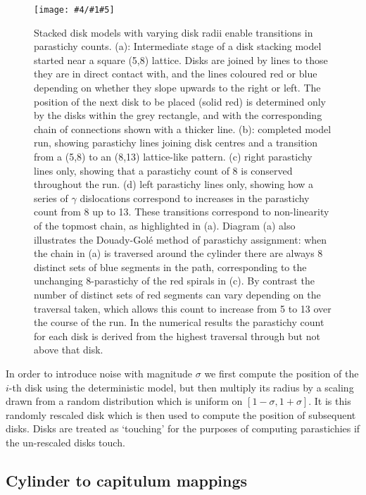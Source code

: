 \documentclass[a4paper,10pt]{amsart}
\newlength{\jfigwidth}
\newcommand{\pdffig}[3]{\jdofig{#1}{#2}{#3}{Figures}{.pdf}}
\newcommand{\jdofig}[5]{
	\begin{figure}\centering\texttt{[image: \#4/\#1\#5]} \caption{#2}\label{fig:#1}\end{figure}
}
\begin{document}
%
\pdffig{scpDeterministicTransition}{
	Stacked disk models with varying disk radii enable transitions in parastichy counts. (a): Intermediate stage of a disk stacking model started near a square  (5,8) lattice. Disks are joined by lines to those they are in direct contact with, and the lines coloured red or blue depending on whether they slope upwards to the right or left. The position of the next disk to be placed (solid red) is determined only by the disks within the grey rectangle, and with the corresponding chain of connections shown with a thicker line. (b): completed model run, showing parastichy lines joining disk centres and a transition  from a (5,8) to an (8,13) lattice-like pattern. (c) right parastichy lines only, showing that a parastichy count of 8 is conserved throughout the run.  (d)  left parastichy lines only, showing how a series of $\gamma$ dislocations correspond to increases in the parastichy count from 8 up to 13. These transitions correspond to non-linearity of the topmost chain, as highlighted in (a). Diagram (a) also illustrates the Douady-Gol\'e method of parastichy assignment:  when the chain in (a) is traversed around the cylinder there are always 8 distinct sets of blue segments in the path, corresponding to the unchanging 8-parastichy of the red spirals in (c). By contrast the number of distinct sets of red segments can vary depending on the traversal taken, which allows this count to increase from 5 to 13 over the course of the run. In the numerical results the parastichy count for each disk is derived from the highest traversal through but not above that disk.
}{1}%
 
  In order to introduce noise with magnitude $\sigma$ we first compute the position of the $i$-th disk using the deterministic model, but then multiply its radius by a scaling drawn from a random distribution which is uniform on $[1-\sigma,1+\sigma]$. It is this randomly rescaled disk which is then used to compute the position of subsequent disks. Disks are treated as `touching' for the purposes of computing parastichies if the un-rescaled disks touch. 
  
 
\subsection{Cylinder to capitulum mappings}
\end{document}
